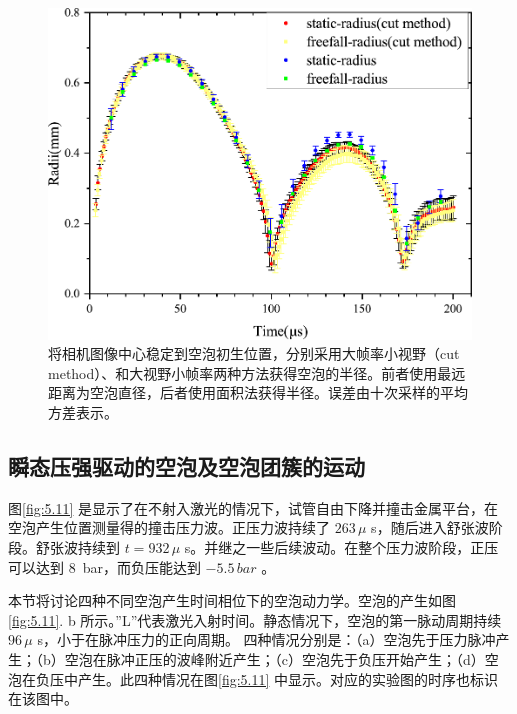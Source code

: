 \begin{figure}[H]
  \centering
  \includegraphics[width=0.7\linewidth]{img/fig5.10-eps-converted-to.pdf}
  \caption[两种方法测得的空泡半径对比]{将相机图像中心稳定到空泡初生位置，分别采用大帧率小视野（cut
method）、和大视野小帧率两种方法获得空泡的半径。前者使用最远距离为空泡直径，后者使用面积法获得半径。误差由十次采样的平均方差表示。
}
  \label{fig:5.10}
\end{figure}




\subsection{瞬态压强驱动的空泡及空泡团簇的运动}

图\ref{fig:5.11}
是显示了在不射入激光的情况下，试管自由下降并撞击金属平台，在空泡产生位置测量得的撞击压力波。正压力波持续了
$263\,\mu$ s，随后进入舒张波阶段。舒张波持续到 $t=932\,\mu$
s。并继之一些后续波动。在整个压力波阶段，正压可以达到 $8\,$
bar，而负压能达到 $-5.5\,bar$ 。

本节将讨论四种不同空泡产生时间相位下的空泡动力学。空泡的产生如图 \ref{fig:5.11}. b
所示。''L''代表激光入射时间。静态情况下，空泡的第一脉动周期持续
$96\,\mu$ s，小于在脉冲压力的正向周期。
四种情况分别是：（a）空泡先于压力脉冲产生；（b）空泡在脉冲正压的波峰附近产生；（c）空泡先于负压开始产生；（d）空泡在负压中产生。此四种情况在图\ref{fig:5.11}
中显示。对应的实验图的时序也标识在该图中。

